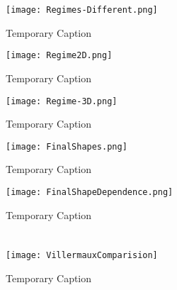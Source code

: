 \documentclass{jfm}
\begin{document}
\begin{figure}
	\centerline{\texttt{[image: Regimes-Different.png]}}%
	\caption{Temporary Caption}
	\label{fig:RegimeShapes}
\end{figure}
\begin{figure}
	\centerline{\texttt{[image: Regime2D.png]}}%
	\caption{Temporary Caption}
	\label{fig:Regime2D}
\end{figure}
\begin{figure}
	\centerline{\texttt{[image: Regime-3D.png]}}%
	\caption{Temporary Caption}
	\label{fig:Regime3D}
\end{figure}
\begin{figure}
	\centerline{\texttt{[image: FinalShapes.png]}}%
	\caption{Temporary Caption}
	\label{fig:FinalShapes}
\end{figure}
\begin{figure}
	\centerline{\texttt{[image: FinalShapeDependence.png]}}%
	\caption{Temporary Caption}
	\label{fig:FinalShapesDep}
\end{figure}
\appendix
\section{}\label{appA}
\begin{figure}
	\centerline{\texttt{[image: VillermauxComparision]}}%
	\caption{Temporary Caption}
	\label{fig:Villermaux}
\end{figure}


\end{document}
